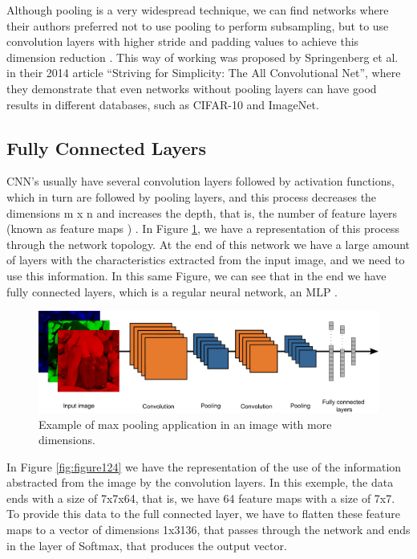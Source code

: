 Although pooling is a very widespread technique, we can find networks where their authors preferred not to use pooling to perform subsampling, but to use convolution layers with higher stride and padding values to achieve this dimension reduction \cite{elgendy2020}\cite{adrian2017}. This way of working was proposed by Springenberg et al. in their 2014 article “Striving for Simplicity: The All Convolutional Net”, where they demonstrate that even networks without pooling layers can have good results in different databases, such as CIFAR-10 and ImageNet.

\subsection{Fully Connected Layers}

CNN's usually have several convolution layers followed by activation functions, which in turn are followed by pooling layers, and this process decreases the dimensions m x n and increases the depth, that is, the number of feature layers (known as feature maps ) \cite{elgendy2020}\cite{geron2019}. In Figure \ref{fig:figure123}, we have a representation of this process through the network topology. At the end of this network we have a large amount of layers with the characteristics extracted from the input image, and we need to use this information. In this same Figure, we can see that in the end we have fully connected layers, which is a regular neural network, an MLP \cite{elgendy2020}.

\begin{figure}
    \centering
    \includegraphics[scale=0.22]{images/figure123.png}
    \caption{Example of max pooling application in an image with more dimensions.}
    \label{fig:figure123}
\end{figure}

In Figure \ref{fig:figure124} we have the representation of the use of the information abstracted from the image by the convolution layers. In this exemple, the data ends with a size of 7x7x64, that is, we have 64 feature maps with a size of 7x7. To provide this data to the full connected layer, we have to flatten these feature maps to a vector of dimensions 1x3136, that passes through the network and ends in the layer of Softmax, that produces the output vector.

